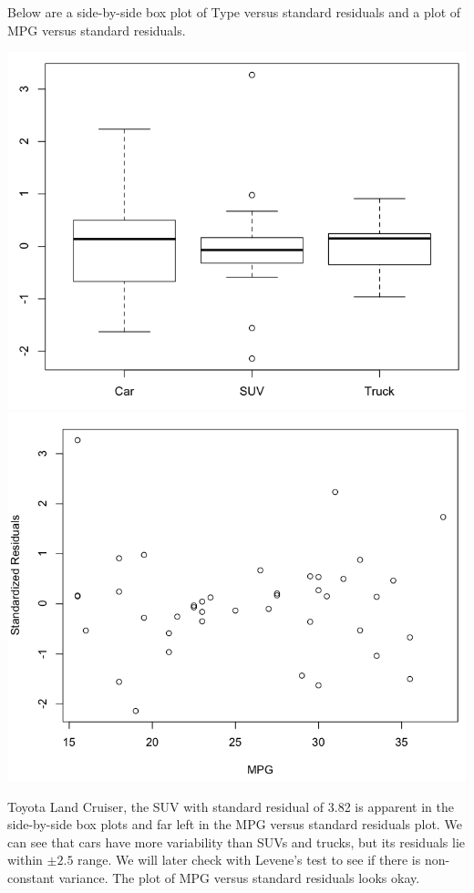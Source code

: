 \documentclass[a4 paper, 11 pt]{article}
\begin{document}
Below are a side-by-side box plot of Type versus standard residuals and a plot of MPG versus standard residuals.
\begin{center}
\includegraphics[scale=0.3]{diagbox}
\includegraphics[scale=0.3]{diagscat}
\end{center}
Toyota Land Cruiser, the SUV with standard residual of 3.82 is apparent in the side-by-side box plots and far left in the MPG versus standard residuals plot. We can see that cars have more variability than SUVs and trucks, but its residuals lie within $\pm 2.5$ range. We will later check with Levene's test to see if there is non-constant variance. The plot of MPG versus standard residuals looks okay.
\end{document}
